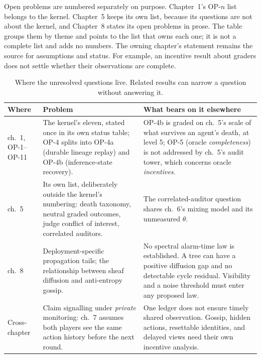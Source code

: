 Open problems are numbered separately on purpose. Chapter~1's
\textsf{OP-$n$} list belongs to the kernel. Chapter~5 keeps its own list,
because its questions are not about the kernel, and Chapter~8 states its open
problems in prose. The table groups them by theme and points to the list that
owns each one; it is not a complete list and adds no numbers. The owning
chapter's statement remains the source for assumptions and status. For
example, an incentive result about graders does not settle whether their
observations are complete.

\begin{table}[H]
\centering
\caption{Where the unresolved questions live. Related results can narrow a
question without answering it.}
\label{tab:op-concordance}
\small
\begin{tabularx}{\textwidth}{@{}>{\raggedright\arraybackslash}p{} >{\raggedright\arraybackslash}p{} >{\raggedright\arraybackslash}X@{}}
\toprule
\textbf{Where} & \textbf{Problem} & \textbf{What bears on it elsewhere} \\
\midrule
ch.~1, \textsf{OP-1}--\textsf{OP-11} & The kernel's eleven, stated once in its own status table; \textsf{OP-4} splits into \textsf{OP-4a} (durable lineage replay) and \textsf{OP-4b} (inference-state recovery). & \textsf{OP-4b} is graded on ch.~5's scale of what survives an agent's death, at level 5; \textsf{OP-5} (oracle \emph{completeness}) is not addressed by ch.~5's audit tower, which concerns oracle \emph{incentives}. \\
ch.~5 & Its own list, deliberately outside the kernel's numbering: death taxonomy, neutral graded outcomes, judge conflict of interest, correlated auditors. & The correlated-auditor question shares ch.~6's mixing model and its unmeasured $\theta$. \\
ch.~8 & Deployment-specific propagation tails; the relationship between sheaf diffusion and anti-entropy gossip. & No spectral alarm-time law is established. A tree can have a positive diffusion gap and no detectable cycle residual. Visibility and a noise threshold must enter any proposed law. \\
Cross-chapter & Claim signalling under \emph{private} monitoring: ch.~7 assumes both players see the same action history before the next round. & One ledger does not ensure timely shared observation. Gossip, hidden actions, resettable identities, and delayed views need their own incentive analysis. \\
\bottomrule
\end{tabularx}
\end{table}

